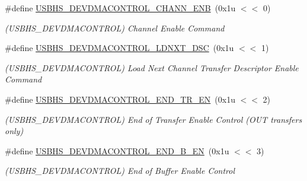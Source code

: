 \begin{DoxyCompactItemize}
\mbox{\label{group__SAMV71__USBHS_gafc5eaec12bce454e6829bdfc4c4594a5}} 
\#define \mbox{\hyperlink{group__SAMV71__USBHS_gafc5eaec12bce454e6829bdfc4c4594a5}{U\+S\+B\+H\+S\+\_\+\+D\+E\+V\+D\+M\+A\+C\+O\+N\+T\+R\+O\+L\+\_\+\+C\+H\+A\+N\+N\+\_\+\+E\+NB}}~(0x1u $<$$<$ 0)
\begin{DoxyCompactList}\small\item\em (U\+S\+B\+H\+S\+\_\+\+D\+E\+V\+D\+M\+A\+C\+O\+N\+T\+R\+OL) Channel Enable Command \end{DoxyCompactList}\item 
\mbox{\label{group__SAMV71__USBHS_ga90c878919619dac6d5c5042f75a54653}} 
\#define \mbox{\hyperlink{group__SAMV71__USBHS_ga90c878919619dac6d5c5042f75a54653}{U\+S\+B\+H\+S\+\_\+\+D\+E\+V\+D\+M\+A\+C\+O\+N\+T\+R\+O\+L\+\_\+\+L\+D\+N\+X\+T\+\_\+\+D\+SC}}~(0x1u $<$$<$ 1)
\begin{DoxyCompactList}\small\item\em (U\+S\+B\+H\+S\+\_\+\+D\+E\+V\+D\+M\+A\+C\+O\+N\+T\+R\+OL) Load Next Channel Transfer Descriptor Enable Command \end{DoxyCompactList}\item 
\mbox{\label{group__SAMV71__USBHS_ga4a472d5573d59ca01ab998d35fe42134}} 
\#define \mbox{\hyperlink{group__SAMV71__USBHS_ga4a472d5573d59ca01ab998d35fe42134}{U\+S\+B\+H\+S\+\_\+\+D\+E\+V\+D\+M\+A\+C\+O\+N\+T\+R\+O\+L\+\_\+\+E\+N\+D\+\_\+\+T\+R\+\_\+\+EN}}~(0x1u $<$$<$ 2)
\begin{DoxyCompactList}\small\item\em (U\+S\+B\+H\+S\+\_\+\+D\+E\+V\+D\+M\+A\+C\+O\+N\+T\+R\+OL) End of Transfer Enable Control (O\+UT transfers only) \end{DoxyCompactList}\item 
\mbox{\label{group__SAMV71__USBHS_ga36a6018ba094d2c25e1e5d43fbf81725}} 
\#define \mbox{\hyperlink{group__SAMV71__USBHS_ga36a6018ba094d2c25e1e5d43fbf81725}{U\+S\+B\+H\+S\+\_\+\+D\+E\+V\+D\+M\+A\+C\+O\+N\+T\+R\+O\+L\+\_\+\+E\+N\+D\+\_\+\+B\+\_\+\+EN}}~(0x1u $<$$<$ 3)
\begin{DoxyCompactList}\small\item\em (U\+S\+B\+H\+S\+\_\+\+D\+E\+V\+D\+M\+A\+C\+O\+N\+T\+R\+OL) End of Buffer Enable Control \end{DoxyCompactList}\item 

\end{DoxyCompactItemize}
